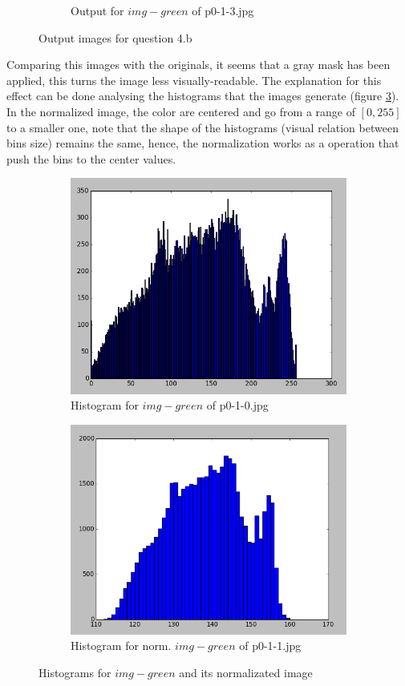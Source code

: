 \begin{enumerate}[label=\emph{\alph*)}]
\begin{figure}[h!]
\begin{subfigure}{0.5\textwidth}
  \caption{Output for $img-green$ of p0-1-3.jpg}
  \label{fig:sfig4}
\end{subfigure}
\caption{Output images for question 4.b}
\label{fig:green-normalization}
\end{figure}

Comparing this images with the originals, it seems that a gray mask has been applied, this turns the image less visually-readable. The explanation for this effect can be done analysing the histograms that the images generate (figure \ref{fig:hist-normalization}). In the normalized image, the color are centered and go from a range of $[0, 255]$ to a smaller one, note that the shape of the histograms (visual relation between bins size) remains the same, hence, the normalization works as a operation that push the bins to the center values.


\begin{figure}[h!]
\centering
\begin{subfigure}{0.5\textwidth}
  \centering
  \includegraphics[width=0.5\linewidth]{../dbg/hist-original.png}
  \caption{Histogram for $img-green$ of p0-1-0.jpg}
\end{subfigure}%
\begin{subfigure}{0.5\textwidth}
  \centering
  \includegraphics[width=0.5\linewidth]{../dbg/hist-normalized.png}
  \caption{Histogram for norm. $img-green$ of  p0-1-1.jpg}
\end{subfigure}
\caption{Histograms for $img-green$ and its normalizated image}
\label{fig:hist-normalization}
\end{figure}



\end{enumerate}
